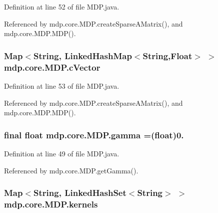 Definition at line 52 of file M\+D\+P.\+java.



Referenced by mdp.\+core.\+M\+D\+P.\+create\+Sparse\+A\+Matrix(), and mdp.\+core.\+M\+D\+P.\+M\+D\+P().

\hypertarget{classmdp_1_1core_1_1_m_d_p_a80af7879a4ff33ac43034eaa934c480f}{}
\subsubsection[{c\+Vector}]{\setlength{\rightskip}{0pt plus 5cm}Map$<$String, Linked\+Hash\+Map$<$String,Float$>$ $>$ mdp.\+core.\+M\+D\+P.\+c\+Vector\hspace{0.3cm}{\ttfamily [private]}}\label{classmdp_1_1core_1_1_m_d_p_a80af7879a4ff33ac43034eaa934c480f}


Definition at line 53 of file M\+D\+P.\+java.



Referenced by mdp.\+core.\+M\+D\+P.\+create\+Sparse\+A\+Matrix(), and mdp.\+core.\+M\+D\+P.\+M\+D\+P().

\hypertarget{classmdp_1_1core_1_1_m_d_p_ab240c1d97d39d6f66cff0c8d06a57a69}{}
\subsubsection[{gamma}]{\setlength{\rightskip}{0pt plus 5cm}final float mdp.\+core.\+M\+D\+P.\+gamma =(float)0.\hspace{0.3cm}{\ttfamily [private]}}\label{classmdp_1_1core_1_1_m_d_p_ab240c1d97d39d6f66cff0c8d06a57a69}


Definition at line 49 of file M\+D\+P.\+java.



Referenced by mdp.\+core.\+M\+D\+P.\+get\+Gamma().

\hypertarget{classmdp_1_1core_1_1_m_d_p_ac185a95b0c9eb78b9d5a00b214696191}{}
\subsubsection[{kernels}]{\setlength{\rightskip}{0pt plus 5cm}Map$<$String, Linked\+Hash\+Set$<$String$>$ $>$ mdp.\+core.\+M\+D\+P.\+kernels\hspace{0.3cm}{\ttfamily [private]}}\label{classmdp_1_1core_1_1_m_d_p_ac185a95b0c9eb78b9d5a00b214696191}


